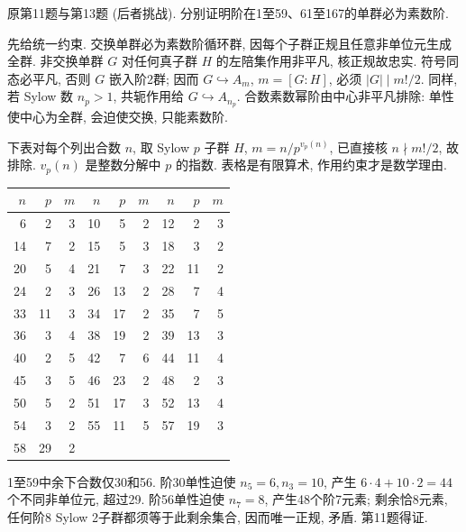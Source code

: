 \begin{exercise}原第11题与第13题 (后者挑战). 分别证明阶在1至59、61至167的单群必为素数阶.\end{exercise}
\begin{solution}
先给统一约束. 交换单群必为素数阶循环群, 因每个子群正规且任意非单位元生成全群. 非交换单群 $G$ 对任何真子群 $H$ 的左陪集作用非平凡, 核正规故忠实. 符号同态必平凡, 否则 $G$ 嵌入阶2群; 因而 $G\hookrightarrow A_m$, $m=[G:H]$, 必须 $|G|\mid m!/2$. 同样, 若 Sylow 数 $n_p>1$, 共轭作用给 $G\hookrightarrow A_{n_p}$. 合数素数幂阶由中心非平凡排除: 单性使中心为全群, 会迫使交换, 只能素数阶.

下表对每个列出合数 $n$, 取 Sylow $p$ 子群 $H$, $m=n/p^{v_p(n)}$, 已直接核 $n\nmid m!/2$, 故排除. $v_p(n)$ 是整数分解中 $p$ 的指数. 表格是有限算术, 作用约束才是数学理由.
\begin{longtable}{@{}rrr@{\qquad}rrr@{\qquad}rrr@{}}
\toprule $n$&$p$&$m$&$n$&$p$&$m$&$n$&$p$&$m$\\\midrule\endhead
6&2&3&10&5&2&12&2&3\\
14&7&2&15&5&3&18&3&2\\
20&5&4&21&7&3&22&11&2\\
24&2&3&26&13&2&28&7&4\\
33&11&3&34&17&2&35&7&5\\
36&3&4&38&19&2&39&13&3\\
40&2&5&42&7&6&44&11&4\\
45&3&5&46&23&2&48&2&3\\
50&5&2&51&17&3&52&13&4\\
54&3&2&55&11&5&57&19&3\\
58&29&2&&&&&&\\
\bottomrule
\end{longtable}
1至59中余下合数仅30和56. 阶30单性迫使 $n_5=6,n_3=10$, 产生 $6\cdot4+10\cdot2=44$ 个不同非单位元, 超过29. 阶56单性迫使 $n_7=8$, 产生48个阶7元素; 剩余恰8元素, 任何阶8 Sylow 2子群都须等于此剩余集合, 因而唯一正规, 矛盾. 第11题得证.


\end{solution}
